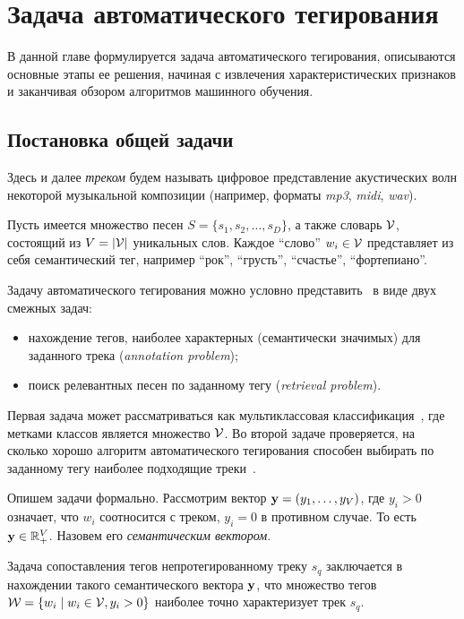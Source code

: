 \chapter{Задача автоматического тегирования}
\label{chapter1}

В данной главе формулируется задача автоматического тегирования, описываются основные этапы ее решения, 
начиная с извлечения характеристических признаков и заканчивая обзором алгоритмов машинного обучения.

\section{Постановка общей задачи}
Здесь и далее \emph{треком} будем называть цифровое представление акустических волн некоторой музыкальной композиции (например, форматы \emph{mp3}, \emph{midi}, \emph{wav}).

Пусть имеется множество песен $S = \{s_1, s_2, \ldots, s_D \}$, а также словарь $ \mathcal{V} $, состоящий из $V = |\mathcal{V}| $ уникальных слов. 
Каждое ``слово'' $w_i \in \mathcal{V}$ представляет из себя семантический тег, например ``рок'', ``грусть'', ``счастье'', ``фортепиано''.

Задачу автоматического тегирования можно условно представить~\cite{turnbull, msordo_thesis} в виде двух смежных задач: 
\begin{itemize}
 \item нахождение тегов, наиболее характерных (семантически значимых) для заданного трека (\emph{annotation problem});
 \item поиск релевантных песен по заданному тегу (\emph{retrieval problem}).
\end{itemize}

Первая задача может рассматриваться как мультиклассовая классификация~\cite{multilabelclassification, multilabel_1}, где метками классов является множество $\mathcal{V}$.
Во второй задаче проверяется, на сколько хорошо алгоритм автоматического тегирования способен выбирать по заданному тегу наиболее подходящие треки~\cite{turnbull}.

Опишем задачи формально.
Рассмотрим вектор $\mathbf{y} = (y_1, \ldots, y_V)$, где $y_i > 0$ означает, что $w_i$ соотносится с треком, $y_i = 0$ в противном случае. То есть $\mathbf{y} \in \mathbb{R}^{V}_{+}$.
Назовем его \emph{семантическим вектором}.

Задача сопоставления тегов непротегированному треку $s_q$ заключается в нахождении такого семантического вектора $\mathbf{y}$, 
что множество тегов $\mathcal{W} = \{w_i \mid w_i \in \mathcal{V}, y_i > 0\}$ наиболее точно характеризует трек $s_q$.

